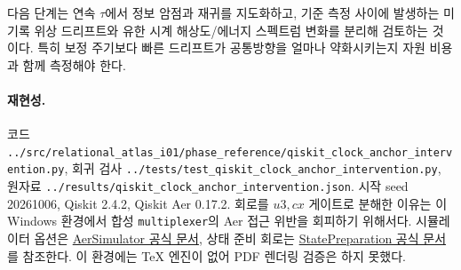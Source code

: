 \documentclass[11pt,a4paper]{article}
\begin{document}
다음 단계는 연속 $\tau$에서 정보 암점과 재귀를 지도화하고, 기준 측정
사이에 발생하는 미기록 위상 드리프트와 유한 시계 해상도/에너지 스펙트럼
변화를 분리해 검토하는 것이다. 특히 보정 주기보다 빠른 드리프트가
공통방향을 얼마나 약화시키는지 자원 비용과 함께 측정해야 한다.

\paragraph{재현성.} 코드
\texttt{../src/relational\_atlas\_i01/phase\_reference/qiskit\_clock\_anchor\_intervention.py}, 회귀 검사
\texttt{../tests/test\_qiskit\_clock\_anchor\_intervention.py}, 원자료
\texttt{../results/qiskit\_clock\_anchor\_intervention.json}.
시작 seed 20261006, Qiskit 2.4.2, Qiskit Aer 0.17.2.
회로를 $u3,cx$ 게이트로 분해한 이유는 이 Windows 환경에서 합성
\texttt{multiplexer}의 Aer 접근 위반을 회피하기 위해서다.
시뮬레이터 옵션은
\href{https://qiskit.github.io/qiskit-aer/stubs/qiskit_aer.AerSimulator.html}{AerSimulator 공식 문서},
상태 준비 회로는
\href{https://quantum.cloud.ibm.com/docs/en/api/qiskit/2.3/qiskit.circuit.library.StatePreparation}{StatePreparation 공식 문서}
를 참조한다. 이 환경에는 TeX 엔진이 없어 PDF 렌더링 검증은 하지 못했다.
\end{document}
